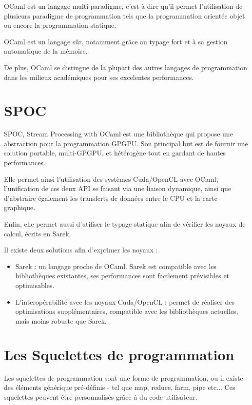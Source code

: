\documentclass{report}
\begin{document}
OCaml est un langage multi-paradigme, c'est à dire qu'il permet l'utilisation de plusieurs paradigme de programmation tels que la programmation orientée objet ou encore la programmation statique. 

OCaml est un langage sûr, notamment grâce au typage fort et à sa gestion automatique de la mémoire. 

De plus, OCaml se distingue de la plupart des autres langages de programmation dans les milieux académiques pour ses excelentes performances. 

\section{SPOC}
SPOC\cite{refSpoc}, Stream Processing with OCaml est une bibliothèque qui propose une abstraction pour la programmation GPGPU. Son principal but est de fournir une solution portable, multi-GPGPU, et hétérogène tout en gardant de hautes performances.\newline

Elle permet ainsi l’utilisation des systèmes Cuda/OpenCL avec OCaml, l’unification de ces deux API se faisant via une liaison dynamique, ainsi que d’abstraire également les transferts de données entre le CPU et la carte graphique.\newline

Enfin, elle permet aussi d’utiliser le typage statique afin de vérifier les noyaux de calcul, écrits en Sarek.\newline

Il existe deux solutions afin d’exprimer les noyaux :
\begin{itemize}
  
\item Sarek : un langage proche de OCaml. Sarek est compatible avec les bibliothèques existantes, ses performances sont facilement prévisibles et optimisables.
  
\item L’interopérabilité avec les noyaux Cuda/OpenCL : permet de réaliser des optimisations supplémentaires, compatible avec les bibliothèques actuelles, mais moins robuste que Sarek.

\end{itemize}
  
\section{Les Squelettes de programmation}

Les squelettes de programmation\cite{refSkeleton} sont une forme de programmation, ou il existe des éléments générique pré-définis - tel que map, reduce, farm, pipe etc... Ces squelettes peuvent être personnalisés grâce à du code utilisateur.\newline
\end{document}
